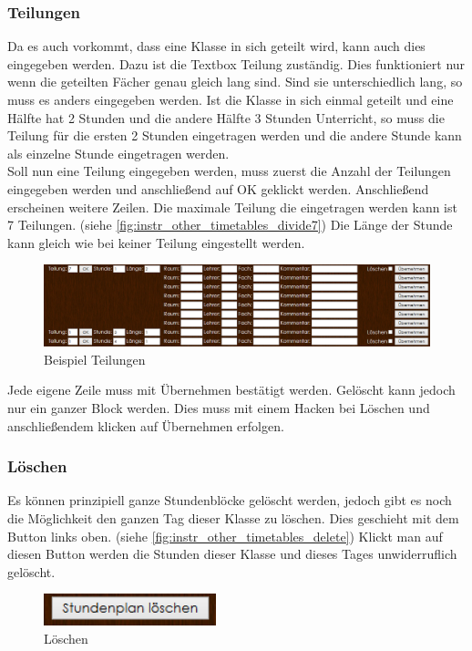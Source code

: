 \subsubsection{Teilungen}
Da es auch vorkommt, dass eine Klasse in sich geteilt wird, kann auch dies eingegeben werden. Dazu ist die Textbox Teilung zuständig. Dies funktioniert nur wenn die geteilten Fächer genau gleich lang sind. Sind sie unterschiedlich lang, so muss es anders eingegeben werden. Ist die Klasse in sich einmal geteilt und eine Hälfte hat 2 Stunden und die andere Hälfte 3 Stunden Unterricht, so muss die Teilung für die ersten 2 Stunden eingetragen werden und die andere Stunde kann als einzelne Stunde eingetragen werden.\\
Soll nun eine Teilung eingegeben werden, muss zuerst die Anzahl der Teilungen eingegeben werden und anschließend auf OK geklickt werden. Anschließend erscheinen weitere Zeilen. Die maximale Teilung die eingetragen werden kann ist 7 Teilungen. (siehe \autoref{fig:instr_other_timetables_divide7}) Die Länge der Stunde kann gleich wie bei keiner Teilung eingestellt werden.
\begin{figure}[H]
\centering
\includegraphics[keepaspectratio=true, width=17cm]{images/screenshots/timetables_input_divide7.png}
\caption{Beispiel Teilungen}
\label{fig:instr_other_timetables_divide7}
\end{figure}
Jede eigene Zeile muss mit Übernehmen bestätigt werden. Gelöscht kann jedoch nur ein ganzer Block werden. Dies muss mit einem Hacken bei Löschen und anschließendem klicken auf Übernehmen erfolgen.
\subsubsection{Löschen}
Es können prinzipiell ganze Stundenblöcke gelöscht werden, jedoch gibt es noch die Möglichkeit den ganzen Tag dieser Klasse zu löschen. Dies geschieht mit dem Button links oben. (siehe \autoref{fig:instr_other_timetables_delete}) Klickt man auf diesen Button werden die Stunden dieser Klasse und dieses Tages unwiderruflich gelöscht.
\begin{figure}[H]
\centering
\includegraphics[keepaspectratio=true, width=5cm]{images/screenshots/timetables_input_delete.png}
\caption{Löschen}
\label{fig:instr_other_timetables_delete}
\end{figure}
